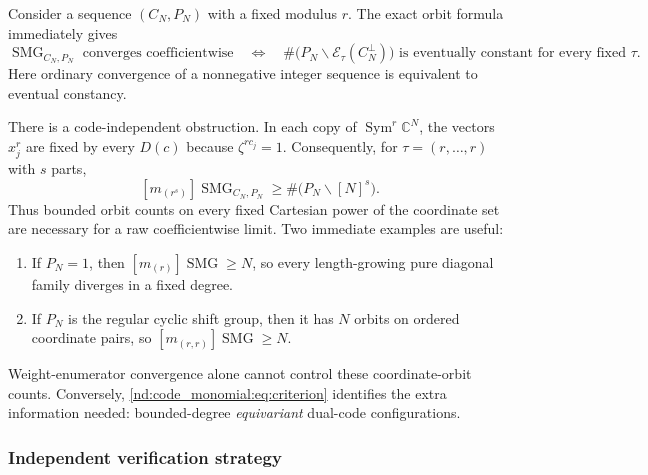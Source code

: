 \documentclass[10pt]{article}
\newcommand{\Sym}{\operatorname{Sym}}
\newcommand{\SMG}{\operatorname{SMG}}
\newcommand{\MGF}{\SMG}
\newcommand{\C}{\mathbb C}
\begin{document}
Consider a sequence $(C_N,P_N)$ with a fixed modulus $r$.  The exact orbit
formula immediately gives
\begin{equation}\label{nd:code_monomial:eq:criterion}
 \MGF_{C_N,P_N}\text{ converges coefficientwise}
 \quad\Longleftrightarrow\quad
 \#\bigl(P_N\backslash\mathcal E_\tau(C_N^\perp)\bigr)
 \text{ is eventually constant for every fixed }\tau.
\end{equation}
Here ordinary convergence of a nonnegative integer sequence is equivalent to
eventual constancy.

There is a code-independent obstruction.  In each copy of $\Sym^r\C^N$,
the vectors $x_j^r$ are fixed by every $D(c)$ because $\zeta^{rc_j}=1$.
Consequently, for $\tau=(r,\ldots,r)$ with $s$ parts,
\begin{equation}\label{nd:code_monomial:eq:obstruction}
 \boxed{[m_{(r^s)}]\MGF_{C_N,P_N}
 \geq\#\bigl(P_N\backslash[N]^s\bigr).}
\end{equation}
Thus bounded orbit counts on every fixed Cartesian power of the coordinate
set are necessary for a raw coefficientwise limit.  Two immediate examples
are useful:
\begin{enumerate}
\item If $P_N=1$, then $[m_{(r)}]\MGF\geq N$, so every length-growing pure
diagonal family diverges in a fixed degree.
\item If $P_N$ is the regular cyclic shift group, then it has $N$ orbits on
ordered coordinate pairs, so $[m_{(r,r)}]\MGF\geq N$.
\end{enumerate}
Weight-enumerator convergence alone cannot control these coordinate-orbit
counts.  Conversely, \eqref{nd:code_monomial:eq:criterion} identifies the extra information
needed: bounded-degree \emph{equivariant} dual-code configurations.

\subsubsection{Independent verification strategy}
\end{document}
